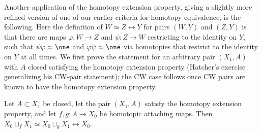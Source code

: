 Another application of the homotopy extension property, giving a slightly more
refined version of one of our earlier criteria for homotopy equivalence, is the
following. Here the definition of $W \simeq Z \rel Y$ for pairs $(W,Y)$ and $(Z,Y)$ is
that there are maps $\varphi : W \to Z$ and $\psi : Z \to W$ restricting to the identity
on $Y$, such that $\psi\varphi \simeq \one$ and $\varphi\psi \simeq \one$ via homotopies
that restrict to the identity on $Y$ at all times. We first prove the statement for an
arbitrary pair $(X_1, A)$ with $A$ closed satisfying the homotopy extension property
(Hatcher's exercise generalizing his CW-pair statement); the CW case follows once CW
pairs are known to have the homotopy extension property.

\begin{lemma}
\label{lem:attach-homotopic-hep-rel}
\leanok
{}
Let $A \subset X_1$ be closed, let the pair $(X_1,A)$ satisfy the homotopy extension
property, and let $f,g : A \to X_0$ be homotopic attaching maps. Then
$X_0 \sqcup_f X_1 \simeq X_0 \sqcup_g X_1 \rel X_0$.
\end{lemma}

